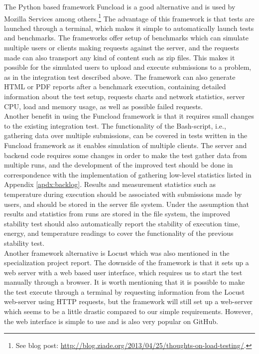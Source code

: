 The Python based framework Funcload \cite{FUNCLOAD} is a good alternative and is used by Mozilla Services among others.\footnote{See blog post: \url{http://blog.ziade.org/2013/04/25/thoughts-on-load-testing/}.} The advantage of this framework is that tests are launched through a terminal, which makes it simple to automatically launch tests and benchmarks. The frameworks offer setup of benchmarks which can simulate multiple users or clients making requests against the server, and the requests made can also transport any kind of content such as zip files. This makes it possible for the simulated users to upload and execute submissions to a problem, as in the integration test described above. The framework can also generate HTML or PDF reports after a benchmark execution, containing detailed information about the test setup, requests charts and network statistics, server CPU, load and memory usage, as well as possible failed requests. \\

Another benefit in using the Funcload framework is that it requires small changes to the existing integration test. The functionality of the Bash-script, i.e., gathering data over multiple submissions, can be covered in tests written in the Funcload framework as it enables simulation of multiple clients. The server and backend code requires some changes in order to make the test gather data from multiple runs, and the development of the improved test should be done in correspondence with the implementation of gathering low-level statistics listed in Appendix \ref{apdx:backlog}. Results and measurement statistics such as temperature during execution should be associated with submissions made by users, and should be stored in the server file system. Under the assumption that results and statistics from runs are stored in the file system, the improved stability test should also automatically report the stability of execution time, energy, and temperature readings to cover the functionality of the previous stability test. \\

Another framework alternative is Locust \cite{LOCUST} which was also mentioned in the specialization project report. The downside of the framework is that it sets up a web server with a web based user interface, which requires us to start the test manually through a browser. It is worth mentioning that it is possible to make the test execute through a terminal by requesting information from the Locust web-server using HTTP requests, but the framework will still set up a web-server which seems to be a little drastic compared to our simple requirements. However, the web interface is simple to use and is also very popular on GitHub. \\

